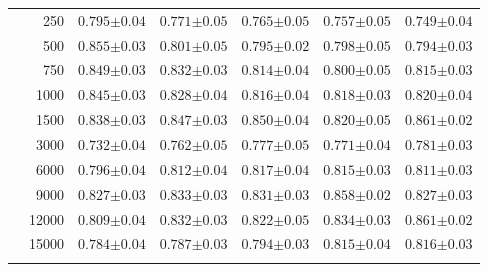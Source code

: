 \begin{table}[p]
\begin{tabularx}{0.75\textwidth}{cr| *{5}{Y}}
& 250 & $0.795{\scriptscriptstyle\pm0.04}$ & $0.771{\scriptscriptstyle\pm0.05}$ & $0.765{\scriptscriptstyle\pm0.05}$ & $0.757{\scriptscriptstyle\pm0.05}$ & $0.749{\scriptscriptstyle\pm0.04}$ \\
& 500 & $\mathbf{0.855{\scriptscriptstyle\pm0.03}}$ & $0.801{\scriptscriptstyle\pm0.05}$ & $0.795{\scriptscriptstyle\pm0.02}$ & $0.798{\scriptscriptstyle\pm0.05}$ & $0.794{\scriptscriptstyle\pm0.03}$ \\
& 750 & $\mathbf{0.849{\scriptscriptstyle\pm0.03}}$ & $0.832{\scriptscriptstyle\pm0.03}$ & $0.814{\scriptscriptstyle\pm0.04}$ & $0.800{\scriptscriptstyle\pm0.05}$ & $0.815{\scriptscriptstyle\pm0.03}$ \\
& 1000 & $0.845{\scriptscriptstyle\pm0.03}$ & $0.828{\scriptscriptstyle\pm0.04}$ & $0.816{\scriptscriptstyle\pm0.04}$ & $0.818{\scriptscriptstyle\pm0.03}$ & $0.820{\scriptscriptstyle\pm0.04}$ \\
& 1500 & $0.838{\scriptscriptstyle\pm0.03}$ & $0.847{\scriptscriptstyle\pm0.03}$ & $0.850{\scriptscriptstyle\pm0.04}$ & $0.820{\scriptscriptstyle\pm0.05}$ & $\mathbf{0.861{\scriptscriptstyle\pm0.02}}$ \\
& 3000 & $0.732{\scriptscriptstyle\pm0.04}$ & $0.762{\scriptscriptstyle\pm0.05}$ & $0.777{\scriptscriptstyle\pm0.05}$ & $0.771{\scriptscriptstyle\pm0.04}$ & $0.781{\scriptscriptstyle\pm0.03}$ \\
& 6000 & $0.796{\scriptscriptstyle\pm0.04}$ & $0.812{\scriptscriptstyle\pm0.04}$ & $\mathbf{0.817{\scriptscriptstyle\pm0.04}}$ & $0.815{\scriptscriptstyle\pm0.03}$ & $0.811{\scriptscriptstyle\pm0.03}$ \\
& 9000 & $0.827{\scriptscriptstyle\pm0.03}$ & $0.833{\scriptscriptstyle\pm0.03}$ & $0.831{\scriptscriptstyle\pm0.03}$ & $\mathbf{0.858{\scriptscriptstyle\pm0.02}}$ & $0.827{\scriptscriptstyle\pm0.03}$ \\
& 12000 & $0.809{\scriptscriptstyle\pm0.04}$ & $0.832{\scriptscriptstyle\pm0.03}$ & $0.822{\scriptscriptstyle\pm0.05}$ & $0.834{\scriptscriptstyle\pm0.03}$ & $\mathbf{0.861{\scriptscriptstyle\pm0.02}}$ \\
& 15000 & $0.784{\scriptscriptstyle\pm0.04}$ & $0.787{\scriptscriptstyle\pm0.03}$ & $0.794{\scriptscriptstyle\pm0.03}$ & $0.815{\scriptscriptstyle\pm0.04}$ & $\mathbf{0.816{\scriptscriptstyle\pm0.03}}$ \\
    \end{tabularx}
\end{table}
